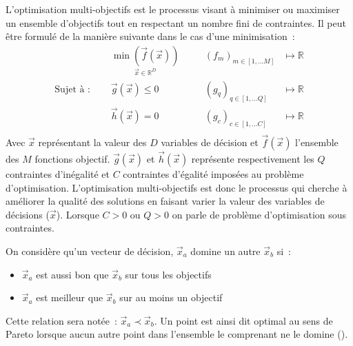 \begin{Def}\label{def:optimisation_multi_objectif}
L’optimisation multi-objectifs est le processus visant à minimiser ou maximiser un ensemble
d’objectifs tout en respectant un nombre fini de contraintes.
Il peut être formulé de la manière suivante dans le cas d’une minimisation~:
\begin{equation}\label{eq:def_optimisation}
  \begin{aligned}
                           & \underset{\vec{x} \in \mathbb{R}^{D}}{\min(\vec{f}(\vec{x}))}&
                           & \quad (f_{m})_{m \in [1,\dotsc M]} & \longmapsto \mathbb{R} \\
    \text{Sujet à~: }\quad & \vec{g}(\vec{x}) \leqslant 0                                 &
                           & \quad (g_{q})_{q \in [1,\dotsc Q]} & \longmapsto \mathbb{R} \\
                           & \vec{h}(\vec{x}) = 0                                         &
                           & \quad (g_{c})_{c \in [1,\dotsc C]} & \longmapsto \mathbb{R} \\
  \end{aligned}
\end{equation}
Avec $\vec{x}$ représentant la valeur des $D$ variables de décision et
$\vec{f}(\vec{x})$ l’ensemble des $M$ fonctions objectif.  $\vec{g}(\vec{x})$ et
$\vec{h}(\vec{x})$ représente respectivement les $Q$ contraintes d’inégalité et
$C$ contraintes d’égalité imposées au problème d’optimisation. L’optimisation
multi-objectifs est donc le processus qui cherche à améliorer la qualité des
solutions en faisant varier la valeur des variables de décisions ($\vec{x}$).
Lorsque $C > 0$ ou $Q > 0$ on parle de problème d’optimisation sous contraintes.
\end{Def}

\begin{Def}\label{def:dominance_de_pareto}
On considère qu’un vecteur de décision, $\vec{x}_{a}$ domine un autre $\vec{x}_{b}$ si~:
\begin{itemize}
  \item $\vec{x}_{a}$ est aussi bon que $\vec{x}_{b}$ sur tous les objectifs
  \item $\vec{x}_{a}$ est meilleur que $\vec{x}_{b}$ sur au moins un objectif
\end{itemize}
Cette relation sera notée~: $\vec{x}_{a} \prec \vec{x}_{b}$.
Un point est ainsi dit optimal au sens de Pareto lorsque aucun autre point dans
l’ensemble le comprenant ne le domine ().
\end{Def}

